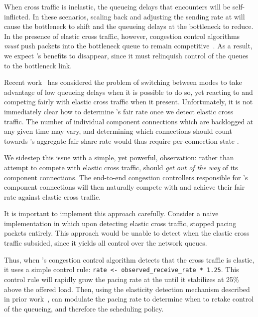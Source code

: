 When cross traffic is inelastic, the queueing delays that \name encounters will be self-inflicted. In these scenarios, scaling back and adjusting the sending rate at \inbox will cause the bottleneck to shift and the queueing delays at the bottleneck to reduce.
In the presence of elastic cross traffic, however, congestion control algorithms \emph{must} push packets into the bottleneck queue to remain competitive~\cite{bbr, copa, nimbus}.
As a result, we expect \name's benefits to disappear, since it must relinquish control of the queues to the bottleneck link.


Recent work~\cite{copa, nimbus} has considered the problem of switching between modes to take advantage of low queueing delays when it is possible to do so, yet reacting to and competing fairly with elastic cross traffic when it present.
Unfortunately, it is not immediately clear how to determine \name's fair rate once we detect elastic cross traffic.
The number of individual component connections which are backlogged at any given time may vary, and determining which connections should count towards \name's aggregate fair share rate would thus require per-connection state .

We sidestep this issue with a simple, yet powerful, observation: rather than attempt to compete with elastic cross traffic, \name should \emph{get out of the way} of its component connections.
The end-to-end congestion controllers responsible for \name's component connections will then naturally compete with and achieve their fair rate against elastic cross traffic.

It is important to implement this approach carefully. 
Consider a naive implementation in which upon detecting elastic cross traffic, \name stopped pacing packets entirely.
This approach would be unable to detect when the elastic cross traffic subsided, since it yields all control over the network queues.

Thus, when \name's congestion control algorithm detects that the cross traffic is elastic, it uses a simple control rule: \texttt{rate <- observed\_receive\_rate * 1.25}. 
This control rule will rapidly grow the pacing rate at the \inbox until it stabilizes at 25\% above the offered load.
Then, using the elasticity detection mechanism described in prior work~\cite{nimbus}, \inbox can modulate the pacing rate to determine when to retake control of the queueing, and therefore the scheduling policy.

